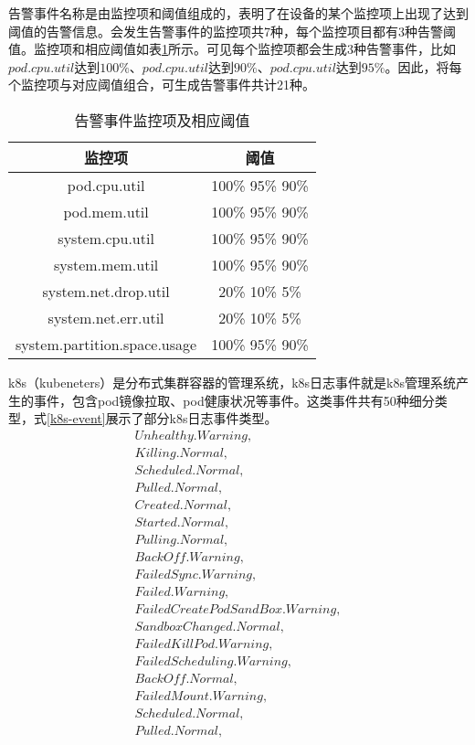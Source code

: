告警事件名称是由监控项和阈值组成的，表明了在设备的某个监控项上出现了达到阈值的告警信息。会发生告警事件的监控项共7种，每个监控项目都有3种告警阈值。监控项和相应阈值如表\ref{alarm-event}所示。可见每个监控项都会生成3种告警事件，比如$pod.cpu.util$达到$100\%$、$pod.cpu.util$达到$90\%$、$pod.cpu.util$达到$95\%$。因此，将每个监控项与对应阈值组合，可生成告警事件共计21种。
\begin{table}[]
    \centering
    \caption{告警事件监控项及相应阈值}
    \label{alarm-event}
    \begin{tabular}{cc}
    \hline
    监控项                          & 阈值              \\ \hline
    pod.cpu.util                 & 100\% 95\% 90\% \\
    pod.mem.util                 & 100\% 95\% 90\% \\
    system.cpu.util              & 100\% 95\% 90\% \\
    system.mem.util              & 100\% 95\% 90\% \\
    system.net.drop.util         & 20\% 10\% 5\%   \\
    system.net.err.util          & 20\% 10\% 5\%   \\
    system.partition.space.usage & 100\% 95\% 90\% \\ \hline
    \end{tabular}
    \end{table}

k8s（kubeneters）是分布式集群容器的管理系统，k8s日志事件就是k8s管理系统产生的事件，包含pod镜像拉取、pod健康状况等事件。这类事件共有50种细分类型，式\ref{k8s-event}展示了部分k8s日志事件类型。
\begin{equation}
    \begin{array}{l}
        Unhealthy.Warning, \\
        Killing.Normal,\\
        Scheduled.Normal,\\
        Pulled.Normal,\\
        Created.Normal,\\
        Started.Normal,\\
        Pulling.Normal,\\
        BackOff.Warning,\\
        FailedSync.Warning,\\
        Failed.Warning,\\
        FailedCreatePodSandBox.Warning,\\
        SandboxChanged.Normal,\\
        FailedKillPod.Warning,\\
        FailedScheduling.Warning,\\
        BackOff.Normal,\\
        FailedMount.Warning,\\ 
        Scheduled.Normal,\\
        Pulled.Normal,\\
    \end{array}
    \label{k8s-event}
\end{equation}

